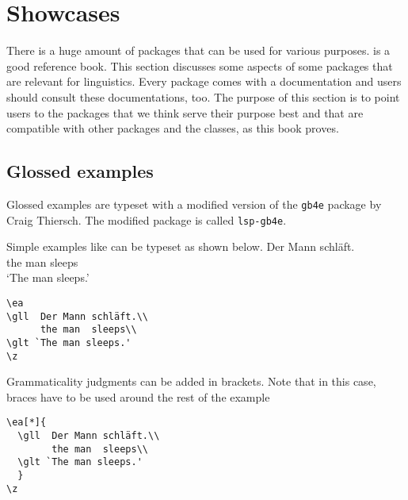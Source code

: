 \chapter{Showcases}

There is a huge amount of packages that can be used for various purposes. \citet{MG2013a} is a good
reference book. This section discusses some aspects of some packages that are relevant for
linguistics. Every \latex package comes with a documentation and users should consult these
documentations, too. The purpose of this section is to point users to the packages that we think
serve their purpose best and that are compatible with other packages and the \lsp classes, as this
book proves.

\section{Glossed examples}

Glossed examples are typeset with a modified version of the \texttt{gb4e} package by Craig
Thiersch. The modified package is called \texttt{lsp-gb4e}. 

Simple examples like  can be typeset as shown below.
\ea\label{ex:showcases:simple}
\gll Der Mann schläft.\\
     the man  sleeps\\
\glt `The man sleeps.'
\z
\begin{verbatim}
\ea
\gll  Der Mann schläft.\\
      the man  sleeps\\
\glt `The man sleeps.'
\z
\end{verbatim}

Grammaticality judgments can be added in brackets. Note that in this case, braces have to be used around the rest of the example
\z
 
\newpage
\begin{verbatim}
\ea[*]{
  \gll  Der Mann schläft.\\
        the man  sleeps\\
  \glt `The man sleeps.'
  }
\z
\end{verbatim} 

